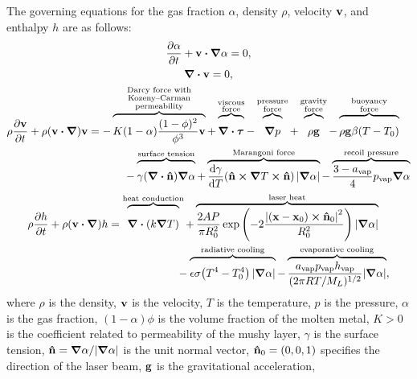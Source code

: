 \documentclass{article}
\newcommand{\evapor}[1]{{#1}_\mathrm{vap}}
\newcommand{\bv}{\vb{v}}
\newcommand{\bn}{\vu{n}}
\newcommand{\bx}{\vb{x}}
\newcommand{\btau}{\vb*\tau}
\begin{document}
The governing equations for the gas fraction $\alpha$, density $\rho$, velocity $\bv$, and enthalpy $h$ are as follows:
\begin{gather}
    \pdv{\alpha}{t} + \bv\vdot\grad\alpha = 0, \label{eq:alpha}\\
    \div\bv = 0, \label{eq:continuity}\\
    \begin{multlined}
    \rho\pdv{\bv}{t} + \rho(\bv\vdot\grad)\bv =
        - \myoverbrace{K(1-\alpha)\frac{(1-\phi)^2}{\phi^3}\bv}
            {Darcy force with\\Kozeny--Carman\\permeability}
        + \myoverbrace{\div\btau}{viscous\\force}
        - \myoverbrace{\grad{p}}{pressure\\force}
        + \myoverbrace{\rho\vb{g}}{gravity\\force}
        - \myoverbrace{\rho\vb{g}\beta(T-T_0)}{buoyancy\\force}\\
        - \myoverbrace{\gamma\qty(\div\bn)\grad\alpha}{surface tension}
        + \myoverbrace{\dv{\gamma}{T}\qty(\bn\cp\grad{T}\cp\bn)|\grad\alpha|}{Marangoni force}
        -\myoverbrace{\frac{3-\evapor{a}}4\evapor{p}\grad\alpha}{recoil pressure}
    \end{multlined}\label{eq:v}\\
    \begin{multlined}
    \rho\pdv{h}{t} + \rho(\bv\vdot\grad)h
        = \myoverbrace[\qty(\frac12)^2]{\div(k\grad{T})}{heat conduction}
        + \myoverbrace{\frac{2AP}{\pi R_0^2}
            \exp\qty(-2\frac{\qty|(\bx-\bx_0)\cp\bn_0|^2}{R_0^2})|\grad\alpha|}{laser heat}\\
        - \myoverbrace{\epsilon\sigma\qty(T^4-T_0^4)|\grad\alpha|}{radiative cooling}
        - \myoverbrace{\frac{\evapor{a}\evapor{p}\evapor{h}}
            {(2\pi RT/M_L)^{1/2}}|\grad\alpha|}{evaporative cooling},
    \end{multlined}\label{eq:h}
\end{gather}
where $\rho$ is the density, $\bv$ is the velocity, $T$ is the temperature,
$p$ is the pressure, $\alpha$ is the gas fraction,
$(1-\alpha)\phi$ is the volume fraction of the molten metal,
$K>0$ is the coefficient related to permeability of the mushy layer,
$\gamma$ is the surface tension,
$\bn = \grad\alpha/|\grad\alpha|$ is the unit normal vector,
$\bn_0 = (0,0,1)$ specifies the direction of the laser beam,
$\vb{g}$ is the gravitational acceleration,
\end{document}

